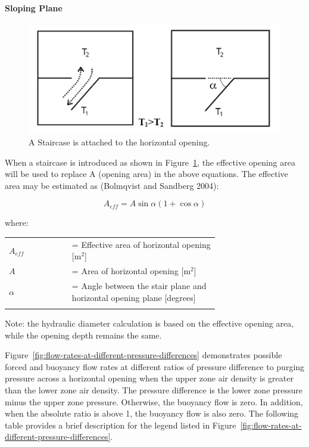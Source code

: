\paragraph{Sloping Plane}\label{sloping-plane}

\begin{figure}[hbtp] %
\centering
\includegraphics[width=0.9\linewidth, height=0.9\textheight, keepaspectratio=true]{media/image2741.png}
\caption{A Staircase is attached to the horizontal opening. \protect \label{fig:a-staircase-is-attached-to-the-horizontal}}
\end{figure}

When a staircase is introduced as shown in Figure~\ref{fig:a-staircase-is-attached-to-the-horizontal}, the effective opening area will be used to replace A (opening area) in the above equations. The effective area may be estimated as (Bolmqvist and Sandberg 2004):

\begin{equation}
A_{eff} = A\sin \alpha (1 + \cos \alpha )
\end{equation}

where:

\begin{tabular}{lp{0.7\linewidth}}
\\
$A_{eff}$ &= Effective area of horizontal opening [m\(^{2}\)]\\
$A$ &= Area of horizontal opening [m\(^{2}\)] \\
$\alpha$ &= Angle between the stair plane and horizontal opening plane [degrees]\\
\\
\end{tabular}

Note: the hydraulic diameter calculation is based on the effective opening area, while the opening depth remains the same.

Figure~\ref{fig:flow-rates-at-different-pressure-differences} demonstrates possible forced and buoyancy flow rates at different ratios of pressure difference to purging pressure across a horizontal opening when the upper zone air density is greater than the lower zone air density. The pressure difference is the lower zone pressure minus the upper zone pressure. Otherwise, the buoyancy flow is zero. In addition, when the absolute ratio is above 1, the buoyancy flow is also zero. The following table provides a brief description for the legend listed in Figure~\ref{fig:flow-rates-at-different-pressure-differences}.

